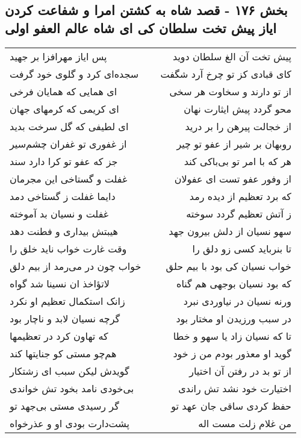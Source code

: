 \begin{center}
\section*{بخش ۱۷۶ - قصد شاه به کشتن امرا و شفاعت کردن  ایاز پیش تخت سلطان کی ای شاه عالم العفو اولی}
\label{sec:sh176}
\begin{longtable}{l p{0.5cm} r}
پس ایاز مهرافزا بر جهید
&&
پیش تخت آن الغ سلطان دوید
\\
سجده‌ای کرد و گلوی خود گرفت
&&
کای قبادی کز تو چرخ آرد شگفت
\\
ای همایی که همایان فرخی
&&
از تو دارند و سخاوت هر سخی
\\
ای کریمی که کرمهای جهان
&&
محو گردد پیش ایثارت نهان
\\
ای لطیفی که گل سرخت بدید
&&
از خجالت پیرهن را بر درید
\\
از غفوری تو غفران چشم‌سیر
&&
روبهان بر شیر از عفو تو چیر
\\
جز که عفو تو کرا دارد سند
&&
هر که با امر تو بی‌باکی کند
\\
غفلت و گستاخی این مجرمان
&&
از وفور عفو تست ای عفولان
\\
دایما غفلت ز گستاخی دمد
&&
که برد تعظیم از دیده رمد
\\
غفلت و نسیان بد آموخته
&&
ز آتش تعظیم گردد سوخته
\\
هیبتش بیداری و فطنت دهد
&&
سهو نسیان از دلش بیرون جهد
\\
وقت غارت خواب ناید خلق را
&&
تا بنرباید کسی زو دلق را
\\
خواب چون در می‌رمد از بیم دلق
&&
خواب نسیان کی بود با بیم حلق
\\
لاتؤاخذ ان نسینا شد گواه
&&
که بود نسیان بوجهی هم گناه
\\
زانک استکمال تعظیم او نکرد
&&
ورنه نسیان در نیاوردی نبرد
\\
گرچه نسیان لابد و ناچار بود
&&
در سبب ورزیدن او مختار بود
\\
که تهاون کرد در تعظیمها
&&
تا که نسیان زاد یا سهو و خطا
\\
هم‌چو مستی کو جنایتها کند
&&
گوید او معذور بودم من ز خود
\\
گویدش لیکن سبب ای زشتکار
&&
از تو بد در رفتن آن اختیار
\\
بی‌خودی نامد بخود تش خواندی
&&
اختیارت خود نشد تش راندی
\\
گر رسیدی مستی بی‌جهد تو
&&
حفظ کردی ساقی جان عهد تو
\\
پشت‌دارت بودی او و عذرخواه
&&
من غلام زلت مست اله
\\

\end{longtable}
\end{center}
